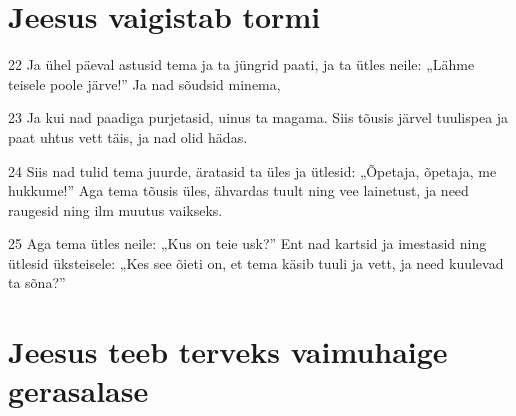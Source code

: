 \section*{Jeesus vaigistab tormi}

\par 22 Ja ühel päeval astusid tema ja ta jüngrid paati, ja ta ütles neile: „Lähme teisele poole järve!” Ja nad sõudsid minema,
\par 23 Ja kui nad paadiga purjetasid, uinus ta magama. Siis tõusis järvel tuulispea ja paat uhtus vett täis, ja nad olid hädas.
\par 24 Siis nad tulid tema juurde, äratasid ta üles ja ütlesid: „Õpetaja, õpetaja, me hukkume!” Aga tema tõusis üles, ähvardas tuult ning vee lainetust, ja need raugesid ning ilm muutus vaikseks.
\par 25 Aga tema ütles neile: „Kus on teie usk?” Ent nad kartsid ja imestasid ning ütlesid üksteisele: „Kes see õieti on, et tema käsib tuuli ja vett, ja need kuulevad ta sõna?”

\section*{Jeesus teeb terveks vaimuhaige gerasalase}

